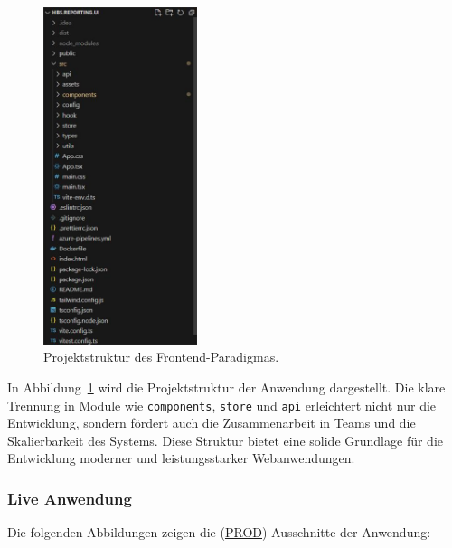 \begin{figure}[H]
    \centering
    \includegraphics[width=0.4\textwidth, keepaspectratio]{images/frontendparadigma.jpg}
    \caption{Projektstruktur des Frontend-Paradigmas.}
    \label{fig:frontend_code_paradigm}
\end{figure}

In Abbildung~\ref{fig:frontend_code_paradigm} wird die Projektstruktur der Anwendung dargestellt. Die klare Trennung in Module wie \texttt{components}, \texttt{store} und \texttt{api} erleichtert nicht nur die Entwicklung, sondern fördert auch die Zusammenarbeit in Teams und die Skalierbarkeit des Systems. Diese Struktur bietet eine solide Grundlage für die Entwicklung moderner und leistungsstarker Webanwendungen.


\subsubsection*{Live Anwendung}
Die folgenden Abbildungen zeigen die (\hyperref[abkuerzungen]{PROD})-Ausschnitte der Anwendung:


